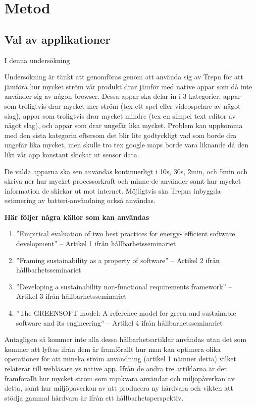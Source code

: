 \section{Metod}
\label{sec:joel_a-method}

\subsection{Val av applikationer}
I denna undersökning


Undersökning är tänkt att genomföras genom att använda sig av Trepn för att jämföra hur mycket ström vår produkt drar jämför med native appar som då inte använder sig av någon browser. Dessa appar ska delar in i 3 kategorier, appar som troligtvis drar mycket mer ström (tex ett spel eller videospelare av något slag), appar som troligtvis drar mycket mindre (tex en simpel text editor av något slag), och appar som drar ungefär lika mycket. Problem kan uppkomma med den sista kategorin eftersom det blir lite godtyckligt vad som borde dra ungefär lika mycket, men skulle tro tex google maps borde vara liknande då den likt vår app konstant skickar ut sensor data.

De valda apparna ska sen användas kontinuerligt i 10s, 30s, 2min, och 5min och skriva ner hur mycket processorkraft och minne de använder samt hur mycket information de skickar ut mot internet. Möjligtvis ska Trepns inbyggda estimering av batteri-användning också användas.

\textbf{Här följer några källor som kan användas}\\

\begin{enumerate}
	\item ''Empirical evaluation of two best practices for energy- efficient software development'' -- Artikel 1 ifrån hållbarhetsseminariet
	\item ''Framing sustainability as a property of software'' -- Artikel 2 ifrån hållbarhetsseminariet
	\item ''Developing a sustainability non-functional requirements framework'' -- Artikel 3 ifrån hållbarhetsseminariet
	\item ''The GREENSOFT model: A reference model for green and sustainable software and its engineering'' -- Artikel 4 ifrån hållbarhetsseminariet
\end{enumerate}

Antagligen så kommer inte alla dessa hålbarhetsartiklar användas utan det som kommer att lyftas ifrån dem är framförallt hur man kan optimera olika operationer för att minska ström användning (artikel 1 nämner detta) vilket relaterar till webläsare vs native app. Ifrån de andra tre artiklarna är det framförallt hur mycket ström som mjukvara användar och miljöpåverkan av detta, samt hur miljöpåverkan av att producera ny hårdvara och vikten att stödja gammal hårdvara är ifrån ett hållbarhetsperspektiv.